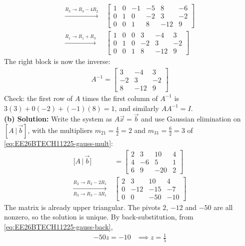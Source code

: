 \begin{enumerate}[label=\thesubsection.\arabic*, ref=\thesubsection.\theenumi]
\begin{align*}
    \xrightarrow{R_3\to R_3-4R_2}\; &\left[\begin{array}{ccc|ccc} 1 & 0 & -1 & -5 & 8 & -6 \\ 0 & 1 & 0 & -2 & 3 & -2 \\ 0 & 0 & 1 & 8 & -12 & 9 \end{array}\right] \\
    \xrightarrow{R_1\to R_1+R_3}\; &\left[\begin{array}{ccc|ccc} 1 & 0 & 0 & 3 & -4 & 3 \\ 0 & 1 & 0 & -2 & 3 & -2 \\ 0 & 0 & 1 & 8 & -12 & 9 \end{array}\right]
\end{align*}
The right block is now the inverse:
\begin{align}
    \boxed{A^{-1} = \begin{bmatrix} 3 & -4 & 3 \\ -2 & 3 & -2 \\ 8 & -12 & 9 \end{bmatrix}}
\end{align}
Check: the first row of $A$ times the first column of $A^{-1}$ is $3(3) + 0(-2) + (-1)(8) = 1$, and similarly $AA^{-1} = I$. \\[8pt]
\textbf{(b) Solution:} Write the system as $A\vec{x}=\vec{b}$ and use Gaussian elimination on $[A\,|\,\vec{b}]$, with the multipliers $m_{21} = \frac{4}{2} = 2$ and $m_{31} = \frac{6}{2} = 3$ of \eqref{eq:EE26BTECH11225-gauss-mult}:
\begin{align*}
    \big[A\,|\,\vec{b}\big] &= \left[\begin{array}{ccc|c} 2 & 3 & 10 & 4 \\ 4 & -6 & 5 & 1 \\ 6 & 9 & -20 & 2 \end{array}\right] \\
    \xrightarrow[R_3\to R_3-3R_1]{R_2\to R_2-2R_1}\; &\left[\begin{array}{ccc|c} 2 & 3 & 10 & 4 \\ 0 & -12 & -15 & -7 \\ 0 & 0 & -50 & -10 \end{array}\right]
\end{align*}
The matrix is already upper triangular. The pivots $2$, $-12$ and $-50$ are all nonzero, so the solution is unique. By back-substitution, from \eqref{eq:EE26BTECH11225-gauss-back},
\begin{align*}
    -50z = -10 &\implies z = \frac{1}{5} \\

\end{align*}
\end{enumerate}
